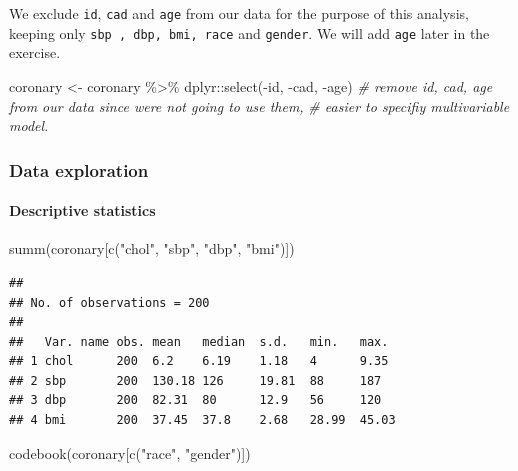\documentclass[
]{book}
\makeatletter
\newenvironment{Shaded}{\begin{snugshade}}{\end{snugshade}}
\newcommand{\CommentTok}[1]{\textcolor[rgb]{0.37,0.37,0.37}{\textit{#1}}}
\newcommand{\FunctionTok}[1]{\textcolor[rgb]{0,0,0}{#1}}
\newcommand{\NormalTok}[1]{#1}
\newcommand{\OtherTok}[1]{\textcolor[rgb]{0.37,0.37,0.37}{#1}}
\newcommand{\SpecialCharTok}[1]{\textcolor[rgb]{0,0,0}{#1}}
\newcommand{\StringTok}[1]{\textcolor[rgb]{0.5,0.5,0.5}{#1}}
\newenvironment{kframe}{%
\medskip{}
\setlength{\fboxsep}{.8em}
 \def\at@end@of@kframe{}%
 \ifinner\ifhmode%
  \def\at@end@of@kframe{\end{minipage}}%
  \begin{minipage}{\columnwidth}%
 \fi\fi%
 \def\FrameCommand##1{\hskip\@totalleftmargin \hskip-\fboxsep
 \colorbox{shadecolor}{##1}\hskip-\fboxsep
     \hskip-\linewidth \hskip-\@totalleftmargin \hskip\columnwidth}%
 \MakeFramed {\advance\hsize-\width
   \@totalleftmargin\z@ \linewidth\hsize
   \@setminipage}}%
 {\par\unskip\endMakeFramed%
 \at@end@of@kframe}
\renewenvironment{Shaded}{\begin{kframe}}{\end{kframe}}
\makeatother
\begin{document}
We exclude \texttt{id}, \texttt{cad} and \texttt{age} from our data for the purpose of this analysis, keeping only \texttt{sbp\ ,\ dbp,\ bmi,\ race} and \texttt{gender}. We will add \texttt{age} later in the exercise.

\begin{Shaded}
\begin{Highlighting}[]
\NormalTok{coronary }\OtherTok{\textless{}{-}}\NormalTok{ coronary }\SpecialCharTok{\%\textgreater{}\%}\NormalTok{ dplyr}\SpecialCharTok{::}\FunctionTok{select}\NormalTok{(}\SpecialCharTok{{-}}\NormalTok{id, }\SpecialCharTok{{-}}\NormalTok{cad, }\SpecialCharTok{{-}}\NormalTok{age)}
\CommentTok{\# remove id, cad, age from our data since we\textquotesingle{}re not going to use them,}
\CommentTok{\# easier to specifiy multivariable model.}
\end{Highlighting}
\end{Shaded}

\hypertarget{data-exploration-1}{%
\subsubsection{Data exploration}\label{data-exploration-1}}

\hypertarget{descriptive-statistics-1}{%
\paragraph{Descriptive statistics}\label{descriptive-statistics-1}}

\begin{Shaded}
\begin{Highlighting}[]
\FunctionTok{summ}\NormalTok{(coronary[}\FunctionTok{c}\NormalTok{(}\StringTok{"chol"}\NormalTok{, }\StringTok{"sbp"}\NormalTok{, }\StringTok{"dbp"}\NormalTok{, }\StringTok{"bmi"}\NormalTok{)])}
\end{Highlighting}
\end{Shaded}

\begin{verbatim}
## 
## No. of observations = 200
## 
##   Var. name obs. mean   median  s.d.   min.   max.  
## 1 chol      200  6.2    6.19    1.18   4      9.35  
## 2 sbp       200  130.18 126     19.81  88     187   
## 3 dbp       200  82.31  80      12.9   56     120   
## 4 bmi       200  37.45  37.8    2.68   28.99  45.03
\end{verbatim}

\begin{Shaded}
\begin{Highlighting}[]
\FunctionTok{codebook}\NormalTok{(coronary[}\FunctionTok{c}\NormalTok{(}\StringTok{"race"}\NormalTok{, }\StringTok{"gender"}\NormalTok{)])}
\end{Highlighting}
\end{Shaded}
\end{document}
